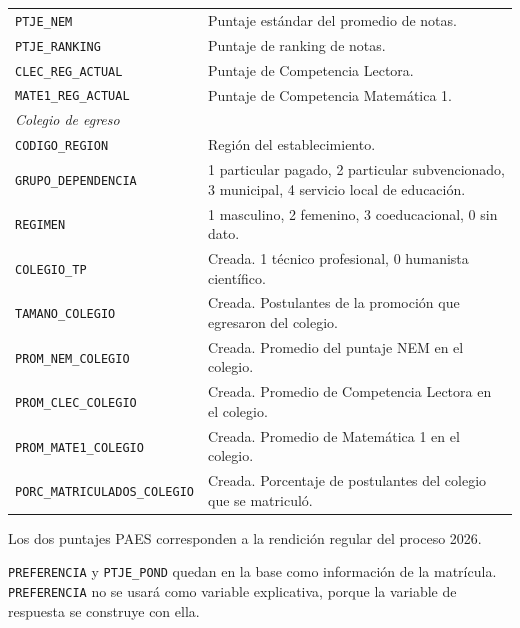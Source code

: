 \documentclass[11pt,letterpaper]{article}
\begin{document}
\begin{longtable}{p{5.2cm}p{9.8cm}}
\texttt{PTJE\_NEM} & Puntaje estándar del promedio de notas. \\
\texttt{PTJE\_RANKING} & Puntaje de ranking de notas. \\
\texttt{CLEC\_REG\_ACTUAL} & Puntaje de Competencia Lectora. \\
\texttt{MATE1\_REG\_ACTUAL} & Puntaje de Competencia Matemática 1. \\
\midrule
\multicolumn{2}{l}{\textit{Colegio de egreso}} \\
\texttt{CODIGO\_REGION} & Región del establecimiento. \\
\texttt{GRUPO\_DEPENDENCIA} & 1 particular pagado, 2 particular subvencionado, 3 municipal, 4 servicio local de educación. \\
\texttt{REGIMEN} & 1 masculino, 2 femenino, 3 coeducacional, 0 sin dato. \\
\texttt{COLEGIO\_TP} & Creada. 1 técnico profesional, 0 humanista científico. \\
\texttt{TAMANO\_COLEGIO} & Creada. Postulantes de la promoción que egresaron del colegio. \\
\texttt{PROM\_NEM\_COLEGIO} & Creada. Promedio del puntaje NEM en el colegio. \\
\texttt{PROM\_CLEC\_COLEGIO} & Creada. Promedio de Competencia Lectora en el colegio. \\
\texttt{PROM\_MATE1\_COLEGIO} & Creada. Promedio de Matemática 1 en el colegio. \\
\texttt{PORC\_MATRICULADOS\_COLEGIO} & Creada. Porcentaje de postulantes del colegio que se matriculó. \\
\end{longtable}

Los dos puntajes PAES corresponden a la rendición regular del proceso 2026.

\texttt{PREFERENCIA} y \texttt{PTJE\_POND} quedan en la base como información de la matrícula. \texttt{PREFERENCIA} no se usará como variable explicativa, porque la variable de respuesta se construye con ella.
\end{document}
